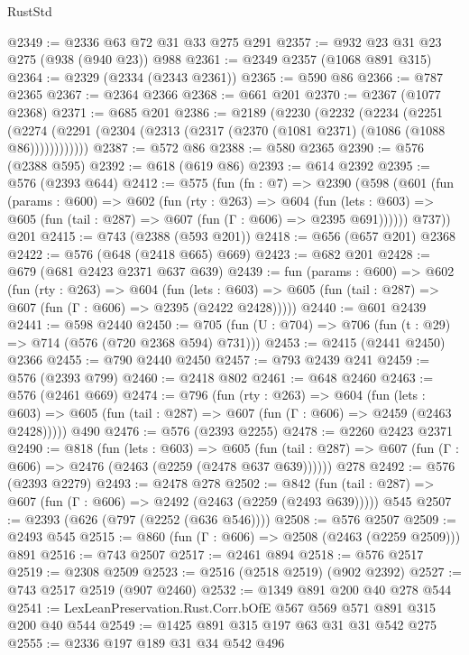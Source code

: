 \begin{lexlean}{RustStd}
\begin{coremodule}
@2349 := @2336 @63 @72 @31 @33 @275 @291
@2357 := @932 @23 @31 @23 @275 (@938 (@940 @23)) @988
@2361 := @2349 @2357 (@1068 @891 @315)
@2364 := @2329 (@2334 (@2343 @2361))
@2365 := @590 @86
@2366 := @787 @2365
@2367 := @2364 @2366
@2368 := @661 @201
@2370 := @2367 (@1077 @2368)
@2371 := @685 @201
@2386 := @2189
    (@2230
      (@2232
        (@2234
          (@2251
            (@2274 (@2291 (@2304 (@2313 (@2317 (@2370 (@1081 @2371) (@1086 (@1088 @86))))))))))))
@2387 := @572 @86
@2388 := @580 @2365
@2390 := @576 (@2388 @595)
@2392 := @618 (@619 @86)
@2393 := @614 @2392
@2395 := @576 (@2393 @644)
@2412 := @575
    (fun (fn : @7) =>
    @2390
      (@598
        (@601
          (fun (params : @600) =>
          @602
            (fun (rty : @263) =>
            @604
              (fun (lets : @603) =>
              @605 (fun (tail : @287) => @607 (fun (Γ : @606) => @2395 @691))))))
        @737))
    @201
@2415 := @743 (@2388 (@593 @201))
@2418 := @656 (@657 @201) @2368
@2422 := @576 (@648 (@2418 @665) @669)
@2423 := @682 @201
@2428 := @679 (@681 @2423 @2371 @637 @639)
@2439 := fun (params : @600) =>
  @602
    (fun (rty : @263) =>
    @604
      (fun (lets : @603) =>
      @605 (fun (tail : @287) => @607 (fun (Γ : @606) => @2395 (@2422 @2428)))))
@2440 := @601 @2439
@2441 := @598 @2440
@2450 := @705 (fun (U : @704) => @706 (fun (t : @29) => @714 (@576 (@720 @2368 @594) @731)))
@2453 := @2415 (@2441 @2450) @2366
@2455 := @790 @2440 @2450
@2457 := @793 @2439 @241
@2459 := @576 (@2393 @799)
@2460 := @2418 @802
@2461 := @648 @2460
@2463 := @576 (@2461 @669)
@2474 := @796
    (fun (rty : @263) =>
    @604
      (fun (lets : @603) =>
      @605 (fun (tail : @287) => @607 (fun (Γ : @606) => @2459 (@2463 @2428)))))
    @490
@2476 := @576 (@2393 @2255)
@2478 := @2260 @2423 @2371
@2490 := @818
    (fun (lets : @603) =>
    @605 (fun (tail : @287) => @607 (fun (Γ : @606) => @2476 (@2463 (@2259 (@2478 @637 @639))))))
    @278
@2492 := @576 (@2393 @2279)
@2493 := @2478 @278
@2502 := @842
    (fun (tail : @287) => @607 (fun (Γ : @606) => @2492 (@2463 (@2259 (@2493 @639)))))
    @545
@2507 := @2393 (@626 (@797 (@2252 (@636 @546))))
@2508 := @576 @2507
@2509 := @2493 @545
@2515 := @860 (fun (Γ : @606) => @2508 (@2463 (@2259 @2509))) @891
@2516 := @743 @2507
@2517 := @2461 @894
@2518 := @576 @2517
@2519 := @2308 @2509
@2523 := @2516 (@2518 @2519) (@902 @2392)
@2527 := @743 @2517 @2519 (@907 @2460)
@2532 := @1349 @891 @200 @40 @278 @544
@2541 := LexLeanPreservation.Rust.Corr.bOfE @567 @569 @571 @891 @315 @200 @40 @544
@2549 := @1425 @891 @315 @197 @63 @31 @31 @542 @275
@2555 := @2336 @197 @189 @31 @34 @542 @496

\end{coremodule}
\end{lexlean}
